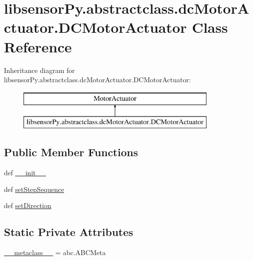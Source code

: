 \hypertarget{classlibsensorPy_1_1abstractclass_1_1dcMotorActuator_1_1DCMotorActuator}{}\section{libsensor\+Py.\+abstractclass.\+dc\+Motor\+Actuator.\+D\+C\+Motor\+Actuator Class Reference}
\label{classlibsensorPy_1_1abstractclass_1_1dcMotorActuator_1_1DCMotorActuator}
Inheritance diagram for libsensor\+Py.\+abstractclass.\+dc\+Motor\+Actuator.\+D\+C\+Motor\+Actuator\+:\begin{figure}[H]
\begin{center}
\leavevmode
\includegraphics[height=2.000000cm]{classlibsensorPy_1_1abstractclass_1_1dcMotorActuator_1_1DCMotorActuator}
\end{center}
\end{figure}
\subsection*{Public Member Functions}
\begin{DoxyCompactItemize}
\item 
def \hyperlink{classlibsensorPy_1_1abstractclass_1_1dcMotorActuator_1_1DCMotorActuator_a289aeef3cb1424252b30fdad28bcca93}{\+\_\+\+\_\+init\+\_\+\+\_\+}
\item 
def \hyperlink{classlibsensorPy_1_1abstractclass_1_1dcMotorActuator_1_1DCMotorActuator_ad95d8804dcdf349e7639b7492d1bf662}{set\+Step\+Sequence}
\item 
def \hyperlink{classlibsensorPy_1_1abstractclass_1_1dcMotorActuator_1_1DCMotorActuator_a2fc9e77a691caa177522c660d0a7f2a8}{set\+Direction}
\end{DoxyCompactItemize}
\subsection*{Static Private Attributes}
\begin{DoxyCompactItemize}
\item 
\hyperlink{classlibsensorPy_1_1abstractclass_1_1dcMotorActuator_1_1DCMotorActuator_a6c7d031e06994a8e1a9c251c61f8c0d5}{\+\_\+\+\_\+metaclass\+\_\+\+\_\+} = abc.\+A\+B\+C\+Meta
\end{DoxyCompactItemize}


